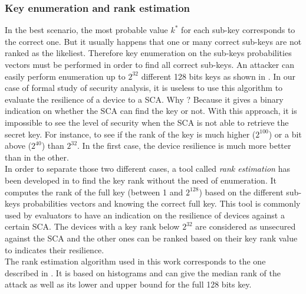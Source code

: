 \subsubsection{Key enumeration and rank estimation}
In the best scenario, the most probable value $k^*$ for each sub-key 
corresponds to the correct one. But it usually happens that one or many 
correct sub-keys are not ranked as the likeliest. Therefore key 
enumeration on the sub-keys probabilities vectors must be performed in 
order to find all correct sub-keys. An attacker can easily perform 
enumeration up to $2^{32}$ different 128 bits keys as shown in 
\cite{key_enumeration}. In our case of formal study of security analysis, 
it is useless to use this algorithm to evaluate the resilience of a device 
to a SCA. Why ? Because it gives a binary indication on whether the SCA 
can find the key or not. With this approach, it is impossible to see the 
level of security when the SCA is not able to retrieve the secret key. For 
instance, to see if the rank of the key is much higher ($2^{100}$) or a 
bit above ($2^{40}$) than $2^{32}$. In the first case, the device 
resilience is much more better than in the other.\\

In order to separate those two different cases, a tool called \textit{rank 
estimation} has been developed in 
\cite{rank_estimation1,rank_estimation_histo} to find the key rank without 
the need of enumeration. It computes the rank of the full key (between 1 
and $2^{128}$) based on the different sub-keys probabilities vectors and 
knowing the correct full key. This tool is commonly used by evaluators to 
have an indication on the resilience of devices against a certain SCA. The 
devices with a key rank below $2^{32}$ are considered as unsecured against 
the SCA and the other ones can be ranked based on their key rank value to 
indicates their resilience. \\

The rank estimation algorithm used in this work corresponds to the one 
described in \cite{rank_estimation_histo}. It is based on histograms and 
can give the median rank of the attack as well as its lower and upper 
bound for the full 128 bits key.




